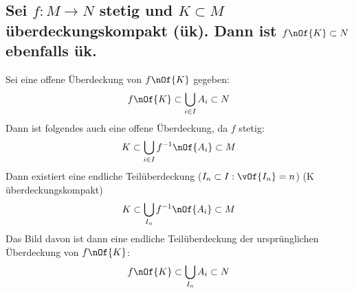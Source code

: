 \subsection{Sei $f: M \to N$ stetig und $K \subset M$ überdeckungskompakt (ük). Dann ist $f\nOf{K} \subset N$ ebenfalls ük.}
Sei eine offene Überdeckung von $f\nOf{K}$ gegeben:
\begin{equation}
	f\nOf{K} \subset \bigcup\limits_{i\in I} A_i \subset N
\end{equation}
Dann ist folgendes auch eine offene Überdeckung, da $f$ stetig:
\begin{equation}
	K \subset \bigcup\limits_{i\in I} f^{-1}\nOf{A_i} \subset M
\end{equation}
Dann existiert eine endliche Teilüberdeckung ($I_n\subset I : \vOf{I_n} = n$) (K überdeckungskompakt)
\begin{equation}
	K \subset \bigcup\limits_{I_n} f^{-1}\nOf{A_i} \subset M
\end{equation}
Das Bild davon ist dann eine endliche Teilüberdeckung der ursprünglichen Überdeckung von $f\nOf{K}$:
\begin{equation}
	f\nOf{K} \subset \bigcup\limits_{I_n} A_i \subset N
\end{equation}
